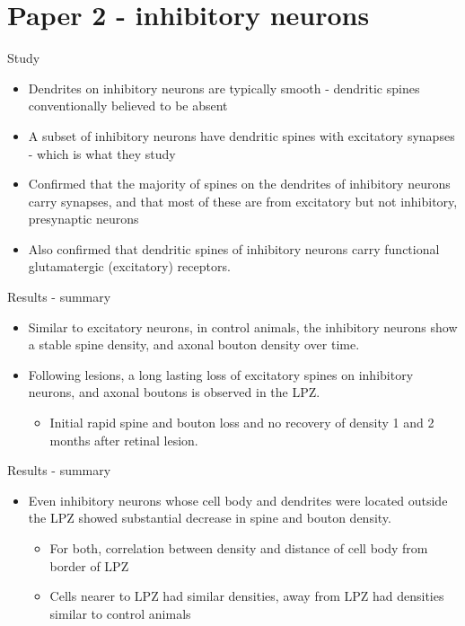 \section{Paper 2 - inhibitory neurons}
\begin{frame}{Study}
  \begin{itemize}
    \item Dendrites on inhibitory neurons are typically smooth - dendritic spines conventionally believed to be absent
    \item A subset of inhibitory neurons have dendritic spines with excitatory synapses - which is what they study
      \pause
    \item Confirmed that the majority of spines on the dendrites of inhibitory neurons carry synapses, and that most of these are from excitatory but not inhibitory, presynaptic neurons
    \item Also confirmed that dendritic spines of inhibitory neurons carry functional glutamatergic (excitatory) receptors.
  \end{itemize}
\end{frame}
\begin{frame}{Results - summary}
  \begin{itemize}
    \item Similar to excitatory neurons, in control animals, the inhibitory neurons show a stable spine density, and axonal bouton density over time.
      \pause
    \item Following lesions, a long lasting loss of excitatory spines on inhibitory neurons, and axonal boutons is observed in the LPZ.
    \begin{itemize}
        \item Initial rapid spine and bouton loss and no recovery of density 1 and 2 months after retinal lesion.
    \end{itemize}
  \end{itemize}
\end{frame}
\begin{frame}{Results - summary}
  \begin{itemize}
    \item Even inhibitory neurons whose cell body and dendrites were located outside the LPZ showed substantial decrease in spine and bouton density.
    \begin{itemize}
        \item For both, correlation between density and distance of cell body from border of LPZ
        \item Cells nearer to LPZ had similar densities, away from LPZ had densities similar to control animals
    \end{itemize}
  \end{itemize}
\end{frame}
